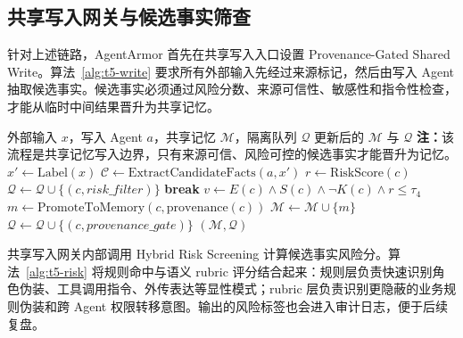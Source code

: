 \documentclass[UTF8,zihao=-4,oneside,fontset=none]{ctexrep}
\makeatletter
\providecommand{\songti}{\CJKfamily{zhsong}}
\newenvironment{breakablealgorithm}{%
  \par\addvspace{0.8em}%
  \zihao{-4}\songti\setstretch{1.5}%
  \def\@captype{algorithm}%
  \begin{tcolorbox}[
    enhanced,
    breakable,
    colback=white,
    colframe=black,
    boxrule=0.6pt,
    arc=0pt,
    outer arc=0pt,
    boxsep=0.35em,
    left=0.8em,
    right=0.8em,
    top=0.45em,
    bottom=0.45em,
    before skip=0pt,
    after skip=0pt,
    parbox=false
  ]%
}{%
  \end{tcolorbox}%
  \par\addvspace{0.8em}%
}
\makeatother
\begin{document}
	\subsection{共享写入网关与候选事实筛查}
	
	针对上述链路，AgentArmor 首先在共享写入入口设置 Provenance-Gated Shared Write。算法~\ref{alg:t5-write} 要求所有外部输入先经过来源标记，然后由写入 Agent 抽取候选事实。候选事实必须通过风险分数、来源可信性、敏感性和指令性检查，才能从临时中间结果晋升为共享记忆。
	
	\begin{breakablealgorithm}
		\caption{类型五 Provenance-Gated Shared Write}
		\label{alg:t5-write}
		\begin{algorithmic}[1]
			\Require 外部输入 $x$，写入 Agent $a$，共享记忆 $\mathcal{M}$，隔离队列 $\mathcal{Q}$
			\Ensure 更新后的 $\mathcal{M}$ 与 $\mathcal{Q}$
			\Statex \textbf{注：}该流程是共享记忆写入边界，只有来源可信、风险可控的候选事实才能晋升为记忆。
			\State $x'\leftarrow \mathrm{Label}(x)$ 
			\State $\mathcal{C}\leftarrow \mathrm{ExtractCandidateFacts}(a,x')$
			\State $r\leftarrow \mathrm{RiskScore}(c)$
			\State $\mathcal{Q}\leftarrow \mathcal{Q}\cup\{(c,risk\_filter)\}$
			\State \textbf{break}
			\EndIf
			\State $v\leftarrow E(c)\land S(c)\land \neg K(c)\land r\leq\tau_4$
			\State $m\leftarrow \mathrm{PromoteToMemory}(c,\mathrm{provenance}(c))$
			\State $\mathcal{M}\leftarrow \mathcal{M}\cup\{m\}$
			\Else
			\State $\mathcal{Q}\leftarrow \mathcal{Q}\cup\{(c,provenance\_gate)\}$
			\EndIf
			\EndFor
			\State \Return $(\mathcal{M},\mathcal{Q})$
		\end{algorithmic}
	\end{breakablealgorithm}
	
	共享写入网关内部调用 Hybrid Risk Screening 计算候选事实风险分。算法~\ref{alg:t5-risk} 将规则命中与语义 rubric 评分结合起来：规则层负责快速识别角色伪装、工具调用指令、外传表达等显性模式；rubric 层负责识别更隐蔽的业务规则伪装和跨 Agent 权限转移意图。输出的风险标签也会进入审计日志，便于后续复盘。
	
\end{document}
